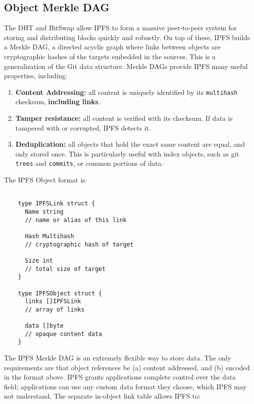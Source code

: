 \documentclass{sig-alternate}
\begin{document}
\subsection{Object Merkle DAG}

The DHT and BitSwap allow IPFS to form a massive peer-to-peer system for storing and distributing blocks quickly and robustly. On top of these, IPFS builds a Merkle DAG, a directed acyclic graph where links between objects are cryptographic hashes of the targets embedded in the sources. This is a generalization of the Git data structure. Merkle DAGs provide IPFS many useful properties, including:

\begin{enumerate}
  \item \textbf{Content Addressing:} all content is uniquely identified by its
        \texttt{multihash} checksum, \textbf{including links}.
  \item \textbf{Tamper resistance:} all content is verified with its checksum.
        If data is tampered with or corrupted, IPFS detects it.
  \item \textbf{Deduplication:} all objects that hold the exact same content
        are equal, and only stored once. This is particularly useful with
        index objects, such as git \texttt{trees} and \texttt{commits}, or common portions of data.
\end{enumerate}

The IPFS Object format is:

\begin{verbatim}

    type IPFSLink struct {
      Name string
      // name or alias of this link

      Hash Multihash
      // cryptographic hash of target

      Size int
      // total size of target
    }

    type IPFSObject struct {
      links []IPFSLink
      // array of links

      data []byte
      // opaque content data
    }

\end{verbatim}


The IPFS Merkle DAG is an extremely flexible way to store data. The only requirements are that object references be (a) content addressed, and (b) encoded in the format above. IPFS grants applications complete control over the data field; applications can use any custom data format they choose, which IPFS may not understand. The separate in-object link table allows IPFS to:
\end{document}
